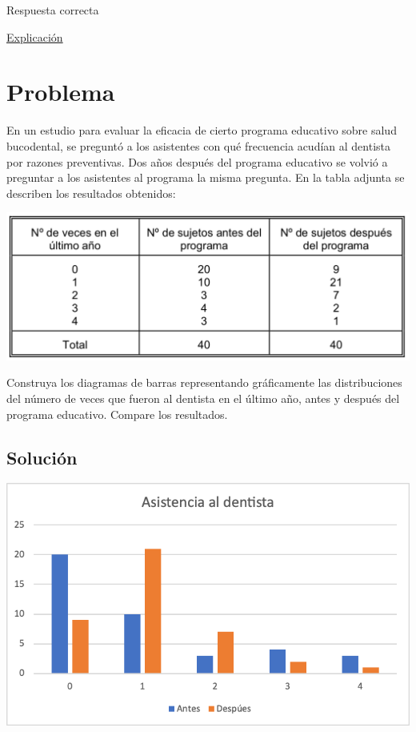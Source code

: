 \documentclass[
]{book}
\begin{document}
Respuesta correcta

\href{https://1fjmanzano.github.io/bioestadistica/diagramas-de-barras-y-sectores.html}{Explicación}

\hypertarget{problema-6}{%
\section{Problema}\label{problema-6}}

En un estudio para evaluar la eficacia de cierto programa educativo sobre salud bucodental, se preguntó a los asistentes con qué frecuencia acudían al dentista por razones preventivas. Dos años después del programa educativo se volvió a preguntar a los asistentes al programa la misma pregunta. En la tabla adjunta se describen los resultados obtenidos:

\includegraphics[width=16.06in]{img/2_2}

Construya los diagramas de barras representando gráficamente las distribuciones del número de veces que fueron al dentista en el último año, antes y después del programa educativo. Compare los resultados.

\hypertarget{soluciuxf3n-5}{%
\subsection{Solución}\label{soluciuxf3n-5}}

\includegraphics[width=10.03in]{img/2_3}
\end{document}
